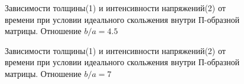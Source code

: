 		\begin{figure}[h!]	
				\def\svgwidth{\columnwidth}
				\caption{Зависимости толщины(1) и интенсивности напряжений(2) от времени при условии идеального скольжения внутри П-образной матрицы. Отношение $b/a = 4.5$} 
				\label{vert_sliging_4ba}
		\end{figure}
				\begin{figure}[h!]	
				\def\svgwidth{\columnwidth}
				\caption{Зависимости толщины(1) и интенсивности напряжений(2) от времени при условии идеального скольжения внутри П-образной матрицы. Отношение $b/a = 7$} 
				\label{vert_sliging_7ba}
		\end{figure}
